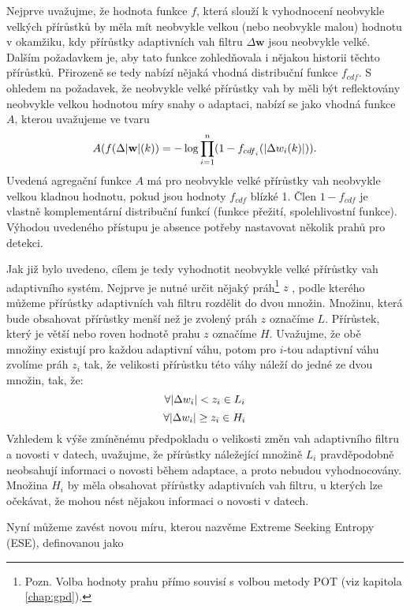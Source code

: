 \par
Nejprve uvažujme, že hodnota funkce $f$, která slouží k vyhodnocení neobvykle velkých přírůstků by měla mít neobvykle velkou (nebo neobvykle malou) hodnotu v okamžiku, kdy přírůstky adaptivních vah filtru $\Delta \textbf{w}$ jsou neobvykle velké. Dalším požadavkem je, aby tato funkce zohledňovala i nějakou historii těchto přírůstků. Přirozeně se tedy nabízí nějaká  vhodná distribuční funkce $f_{cdf}$. S ohledem na požadavek, že neobvykle velké přírůstky vah by měli být reflektovány neobvykle velkou hodnotou míry snahy o adaptaci, nabízí se jako vhodná funkce $A$, kterou uvažujeme ve tvaru
\begin{equation} \label{eq:ND_score}
A(f(\Delta \lvert\textbf{w}\rvert(k)) = -\log \prod_{i=1}^n(1 - f_{{cdf}_i}(\lvert \Delta  w_i(k)\rvert)).
\end{equation}
Uvedená agregační funkce $A$ má pro neobvykle velké přírůstky vah neobvykle velkou kladnou hodnotu, pokud jsou hodnoty $f_{cdf}$ blízké 1. Člen $1-f_{cdf}$ je vlastně komplementární distribuční funkcí (funkce přežití, spolehlivostní funkce). Výhodou uvedeného přístupu je absence potřeby nastavovat několik prahů pro detekci.
\par 
Jak již bylo uvedeno, cílem je tedy vyhodnotit neobvykle velké přírůstky vah adaptivního systém. Nejprve je nutné určit nějaký práh\footnote{Pozn. Volba hodnoty prahu přímo souvisí s volbou metody POT (viz kapitola \ref{chap:gpd}).} $z$ , podle kterého můžeme přírůstky adaptivních vah filtru rozdělit do dvou množin. Množinu, která bude obsahovat přírůstky menší než je zvolený práh $z$ označíme $L$. Přírůstek, který je větší nebo roven hodnotě prahu $z$ označíme $H$.  Uvažujme, že obě množiny existují pro každou adaptivní váhu, potom pro $i$-tou adaptivní váhu zvolíme práh $z_i$ tak, že velikosti přírůstku této váhy náleží do jedné ze dvou množin, tak, že:
\begin{equation}
\forall \lvert\Delta w_i\rvert < z_i \in L_i
\end{equation}
\begin{equation}
\forall \lvert\Delta w_i\rvert \geq z_i \in H_i
\end{equation}
Vzhledem k výše zmíněnému předpokladu o velikosti změn vah adaptivního filtru a novosti v datech, uvažujme, že přírůstky náležející množině $L_i$ pravděpodobně neobsahují informaci o novosti během adaptace, a proto nebudou vyhodnocovány. Množina $H_i$ by měla obsahovat přírůstky adaptivních vah filtru, u kterých lze očekávat, že mohou nést nějakou informaci o novosti v datech.
\par
Nyní můžeme zavést novou míru, kterou nazvěme Extreme Seeking Entropy (ESE), definovanou jako

